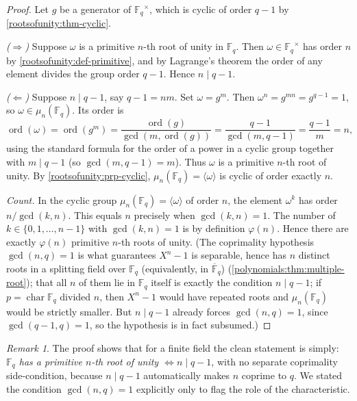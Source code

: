 \documentclass[11pt,a4paper]{article}
\theoremstyle{definition}
\theoremstyle{remark}
\newtheorem{remark}[theorem]{Remark}
\newcommand{\F}{\ensuremath{\mathbb{F}}}
\newcommand{\Fq}{\ensuremath{\mathbb{F}_{q}}}
\DeclareMathOperator{\ord}{ord}
\begin{document}
\begin{proof}
Let \(g\) be a generator of \(\Fq^\times\), which is cyclic of order \(q-1\) by \cref{rootsofunity:thm-cyclic}.

\smallskip
\noindent\emph{(\(\Rightarrow\))} Suppose \(\omega\) is a primitive \(n\)-th root of unity in \(\Fq\). Then \(\omega \in \Fq^\times\) has order \(n\) by \cref{rootsofunity:def-primitive}, and by Lagrange's theorem the order of any element divides the group order \(q-1\). Hence \(n \mid q-1\).

\smallskip
\noindent\emph{(\(\Leftarrow\))} Suppose \(n \mid q-1\), say \(q - 1 = n m\). Set \(\omega = g^{m}\). Then \(\omega^n = g^{mn} = g^{q-1} = 1\), so \(\omega \in \mu_n(\Fq)\). Its order is
\[
  \ord(\omega) = \ord(g^m) = \frac{\ord(g)}{\gcd(m, \ord(g))} = \frac{q-1}{\gcd(m, q-1)} = \frac{q-1}{m} = n,
\]
using the standard formula for the order of a power in a cyclic group together with \(m \mid q-1\) (so \(\gcd(m,q-1)=m\)). Thus \(\omega\) is a primitive \(n\)-th root of unity. By \cref{rootsofunity:prp-cyclic}, \(\mu_n(\Fq) = \langle \omega \rangle\) is cyclic of order exactly \(n\).

\smallskip
\noindent\emph{Count.} In the cyclic group \(\mu_n(\Fq) = \langle \omega \rangle\) of order \(n\), the element \(\omega^k\) has order \(n / \gcd(k,n)\). This equals \(n\) precisely when \(\gcd(k,n) = 1\). The number of \(k \in \{0,1,\dots,n-1\}\) with \(\gcd(k,n)=1\) is by definition \(\varphi(n)\). Hence there are exactly \(\varphi(n)\) primitive \(n\)-th roots of unity. (The coprimality hypothesis \(\gcd(n,q)=1\) is what guarantees \(X^n-1\) is separable, hence has \(n\) distinct roots in a splitting field over \(\Fq\) (equivalently, in \(\overline{\F}_q\)) (\cref{polynomials:thm:multiple-root}); that all \(n\) of them lie in \(\Fq\) itself is exactly the condition \(n \mid q-1\); if \(p = \operatorname{char}\Fq\) divided \(n\), then \(X^n - 1\) would have repeated roots and \(\mu_n(\Fq)\) would be strictly smaller. But \(n \mid q-1\) already forces \(\gcd(n,q)=1\), since \(\gcd(q-1,q)=1\), so the hypothesis is in fact subsumed.)
\end{proof}

\begin{remark}\label{rootsofunity:rem-subsumed}
The proof shows that for a finite field the clean statement is simply: \emph{\(\Fq\) has a primitive \(n\)-th root of unity \(\iff n \mid q-1\)}, with no separate coprimality side-condition, because \(n \mid q-1\) automatically makes \(n\) coprime to \(q\). We stated the condition \(\gcd(n,q)=1\) explicitly only to flag the role of the characteristic.
\end{remark}
\end{document}
